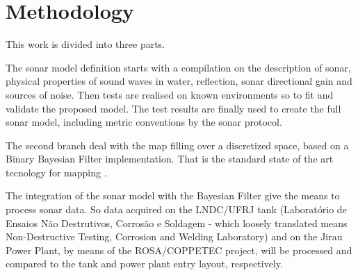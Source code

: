 

\section{Methodology}
 


% 


This work is divided into three parts.

The sonar model definition starts with a compilation on the description of sonar,
physical properties of sound waves in water, reflection, sonar
directional gain and sources of noise. Then tests are realised on known
environments so to fit and validate the proposed model. The test results are
finally used to create the full sonar model, including metric conventions by the
sonar protocol.

The second branch deal with the map filling over a discretized space, based on
a Binary Bayesian Filter implementation. That is the standard state of the art
tecnology for mapping \cite{thrunprob}.



The integration of the sonar model with the Bayesian Filter give the means to
process sonar data. So data acquired on the LNDC/UFRJ tank (Laboratório de
Ensaios Não Destrutivos, Corrosão e Soldagem - which loosely translated means
Non-Destructive Testing, Corrosion and Welding Laboratory) and on the Jirau
Power Plant, by means of the ROSA/COPPETEC project, will be processed and
compared to the tank and power plant entry layout, respectively.
 
